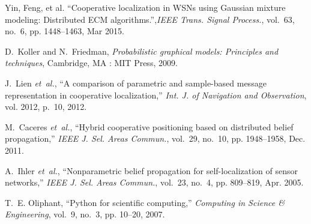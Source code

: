 \documentclass[10pt, final, journal]{IEEEtran}
\begin{document}
\begin{thebibliography}{10}
Yin, Feng, et al. ``Cooperative localization in WSNs using Gaussian mixture modeling: Distributed ECM algorithms.'',\emph{IEEE Trans. Signal Process.}, vol.~63, no.~6, pp. 1448--1463,  Mar 2015.


D.~Koller and N.~Friedman, \emph{Probabilistic graphical models: Principles and techniques}, Cambridge, MA : MIT Press, 2009.

J.~Lien \emph{et~al.}, ``A comparison of parametric and sample-based message representation in cooperative localization,'' \emph{Int. J. of Navigation and Observation}, vol. 2012, p.~10, 2012.

M.~Caceres \emph{et~al.}, ``Hybrid cooperative positioning based on distributed belief propagation,'' \emph{IEEE J. Sel. Areas Commun.}, vol.~29, no.~10, pp. 1948--1958, Dec. 2011.

A.~Ihler \emph{et~al.}, ``Nonparametric belief propagation for self-localization of sensor networks,'' \emph{IEEE J. Sel. Areas Commun.},  vol.~23, no.~4, pp. 809--819, Apr. 2005.

T.~E. Oliphant, ``Python for scientific computing,'' \emph{Computing in Science \& Engineering}, vol.~9, no.~3, pp. 10--20, 2007.
\end{thebibliography}
\end{document}
